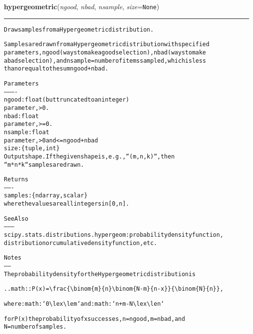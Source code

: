     \label{trunk:qstkutil:bollinger:hypergeometric}

    \vspace{0.5ex}

\hspace{.8\funcindent}\begin{boxedminipage}{\funcwidth}

    \raggedright \textbf{hypergeometric}(\textit{ngood}, \textit{nbad}, \textit{nsample}, \textit{size}={\tt None})

    \vspace{-1.5ex}

    \rule{\textwidth}{0.5\fboxrule}
\setlength{\parskip}{2ex}
\begin{alltt}
Draw samples from a Hypergeometric distribution.

Samples are drawn from a Hypergeometric distribution with specified
parameters, ngood (ways to make a good selection), nbad (ways to make
a bad selection), and nsample = number of items sampled, which is less
than or equal to the sum ngood + nbad.

Parameters
----------
ngood : float (but truncated to an integer)
        parameter, {\textgreater} 0.
nbad  : float
        parameter, {\textgreater}= 0.
nsample  : float
           parameter, {\textgreater} 0 and {\textless}= ngood+nbad
size : \{tuple, int\}
    Output shape.  If the given shape is, e.g., ``(m, n, k)``, then
    ``m * n * k`` samples are drawn.

Returns
-------
samples : \{ndarray, scalar\}
          where the values are all integers in  [0, n].

See Also
--------
scipy.stats.distributions.hypergeom : probability density function,
    distribution or cumulative density function, etc.

Notes
-----
The probability density for the Hypergeometric distribution is

.. math:: P(x) = {\textbackslash}frac\{{\textbackslash}binom\{m\}\{n\}{\textbackslash}binom\{N-m\}\{n-x\}\}\{{\textbackslash}binom\{N\}\{n\}\},

where :math:`0 {\textbackslash}le x {\textbackslash}le m` and :math:`n+m-N {\textbackslash}le x {\textbackslash}le n`

for P(x) the probability of x successes, n = ngood, m = nbad, and
N = number of samples.


\end{alltt}
\end{boxedminipage}

